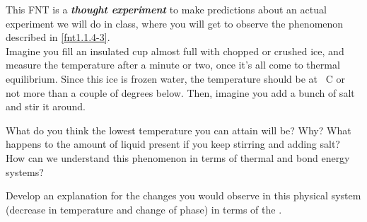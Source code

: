\label{fnt1.1.4-4}


This FNT is a \textbf{\emph{thought experiment}} to make predictions about an actual experiment we will do in class, where you will get to observe the phenomenon described in \ref{fnt1.1.4-3}.\\

Imagine you fill an insulated cup almost full with chopped or crushed ice, and measure the temperature after a minute or two, once it's all come to thermal equilibrium. Since this ice is frozen water, the temperature should be at \unit[0]{\textdegree C} or not more than a couple of degrees below. Then, imagine you add a bunch of salt and stir it around. 

What do you think the lowest temperature you can attain will be? Why? What happens to the amount of liquid present if you keep stirring and adding salt? How can we understand this phenomenon in terms of thermal and bond energy systems?

Develop an explanation for the changes you would observe in this physical system (decrease in temperature and change of phase) in terms of the \EnergyInteractionModel{}.